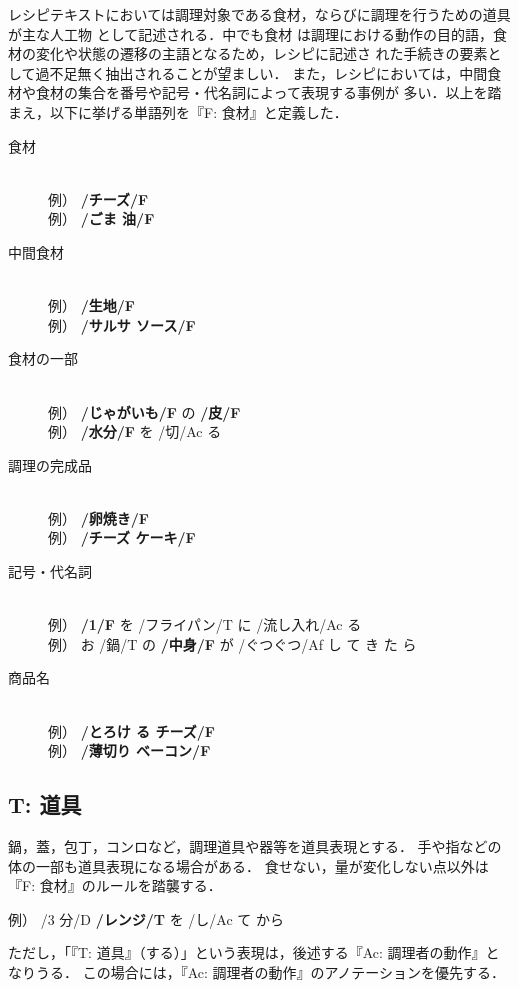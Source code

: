 \documentclass[japanese]{jnlp_1.4}
\begin{document}
レシピテキストにおいては調理対象である食材，ならびに調理を行うための道具が主な人工物
として記述される．中でも食材
は調理における動作の目的語，食材の変化や状態の遷移の主語となるため，レシピに記述さ 
れた手続きの要素として過不足無く抽出されることが望ましい．
また，レシピにおいては，中間食材や食材の集合を番号や記号・代名詞によって表現する事例が
多い．以上を踏まえ，以下に挙げる単語列を『F: 食材』と定義した．
\begin{description}
 \item [食材]\mbox{}\\
	     例） {\bf /チーズ/F}\\
	     例） {\bf /ごま 油/F}
 \item [中間食材]\mbox{}\\
	     例） {\bf /生地/F}\\
	     例） {\bf /サルサ ソース/F}
 \item [食材の一部]\mbox{}\\
	     例） {\bf /じゃがいも/F} の {\bf /皮/F}\\
	     例） {\bf /水分/F} を /切/Ac る
 \item [調理の完成品]\mbox{}\\
	     例） {\bf /卵焼き/F}\\
	     例） {\bf /チーズ ケーキ/F}
 \item [記号・代名詞]\mbox{}\\
	     例） {\bf /1/F} を /フライパン/T に /流し入れ/Ac る\\
	     例） お /鍋/T の {\bf /中身/F} が /ぐつぐつ/Af し て き た ら
 \item [商品名]\mbox{}\\
	     例） {\bf /とろけ る チーズ/F}\\
	     例） {\bf /薄切り ベーコン/F}
\end{description}


\subsection{T: 道具}

鍋，蓋，包丁，コンロなど，調理道具や器等を道具表現とする．
手や指などの体の一部も道具表現になる場合がある．
食せない，量が変化しない点以外は『F: 食材』のルールを踏襲する．

\quad \noindent 例） /3 分/D {\bf /レンジ/T} を /し/Ac て から

ただし，「『T: 道具』（する）」という表現は，後述する『Ac: 調理者の動作』となりうる．
この場合には，『Ac: 調理者の動作』のアノテーションを優先する．
\end{document}
